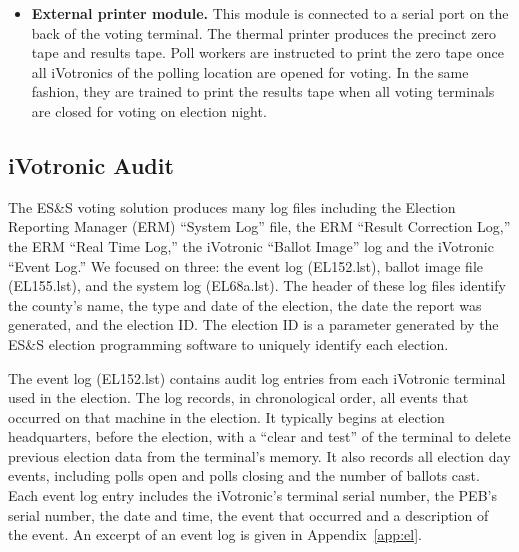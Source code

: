 \begin{itemize}
\item \textbf{External printer module.} This module is connected to a serial port on the back of the voting terminal. The thermal printer produces the precinct zero tape and results tape. Poll workers are instructed to print the zero tape once all iVotronics of the polling location are opened for voting. In the same fashion, they are trained to print the results tape when all voting terminals are closed for voting on election night.
\end{itemize}

\subsection{iVotronic Audit}
The ES\&S voting solution produces many log files including the Election Reporting Manager (ERM) \textquotedblleft System Log\textquotedblright \hspace{1 mm} file, the ERM \textquotedblleft Result Correction Log,\textquotedblright \hspace{1 mm} the ERM \textquotedblleft Real Time Log,\textquotedblright \hspace{1 mm} the iVotronic \textquotedblleft Ballot Image\textquotedblright \hspace{1 mm} log and the iVotronic \textquotedblleft Event Log.\textquotedblright \hspace{2 mm} We focused on three: the event log (EL152.lst), ballot image file (EL155.lst), and the system log (EL68a.lst).  The header of these log files identify the county's name, the type and date of the election, the date the report was generated, and the election ID. The election ID is a parameter generated by the ES\&S election programming software to uniquely identify each election. 
 
The event log (EL152.lst) contains audit log entries from each iVotronic terminal used in the election.  The log  records, in  chronological order, all events that occurred on that machine in the election. It typically begins at election headquarters, before the election, with a \textquotedblleft clear and test\textquotedblright \hspace{1 mm} of the terminal to delete previous election data from the terminal's memory. It also records all election day events, including polls open and polls closing and the number of ballots cast.  Each event log entry includes the iVotronic's terminal serial number, the PEB's serial number, the date and time, the event that occurred and a description of the event. An excerpt of  an event log is given in  Appendix~\ref{app:el}. 
 
